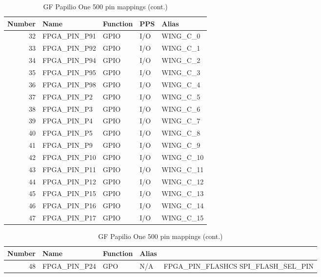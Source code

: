 \begin{table}[H]
\begin{center}
\begin{tabularx}{14cm}{rlllX}
Number & Name & Function & PPS & Alias \\
\hline
32 & FPGA\_PIN\_P91 & GPIO & I/O & WING\_C\_0 \\
33 & FPGA\_PIN\_P92 & GPIO & I/O & WING\_C\_1 \\
34 & FPGA\_PIN\_P94 & GPIO & I/O &  WING\_C\_2 \\
35 & FPGA\_PIN\_P95 & GPIO & I/O & WING\_C\_3 \\
36 & FPGA\_PIN\_P98 & GPIO & I/O & WING\_C\_4 \\
37 & FPGA\_PIN\_P2  & GPIO & I/O & WING\_C\_5 \\
38 & FPGA\_PIN\_P3  & GPIO & I/O & WING\_C\_6 \\
39 & FPGA\_PIN\_P4  & GPIO & I/O & WING\_C\_7 \\
40 & FPGA\_PIN\_P5  & GPIO & I/O & WING\_C\_8 \\
41 & FPGA\_PIN\_P9  & GPIO & I/O & WING\_C\_9 \\
42 & FPGA\_PIN\_P10 & GPIO & I/O & WING\_C\_10 \\
43 & FPGA\_PIN\_P11 & GPIO & I/O & WING\_C\_11 \\
44 & FPGA\_PIN\_P12 & GPIO & I/O & WING\_C\_12 \\
45 & FPGA\_PIN\_P15 & GPIO & I/O & WING\_C\_13 \\
46 & FPGA\_PIN\_P16 & GPIO & I/O & WING\_C\_14 \\
47 & FPGA\_PIN\_P17 & GPIO & I/O & WING\_C\_15 
\end{tabularx}
\caption{GF Papilio One 500 pin mappings (cont.)}
\end{center}
\end{table}


\begin{table}[H]
\begin{center}
\begin{tabularx}{14cm}{rlllX}
Number & Name & Function & Alias \\
\hline
48 & FPGA\_PIN\_P24 & GPO & N/A &  FPGA\_PIN\_FLASHCS SPI\_FLASH\_SEL\_PIN \\
\end{tabularx}
\caption{GF Papilio One 500 pin mappings (cont.)}
\end{center}
\end{table}

